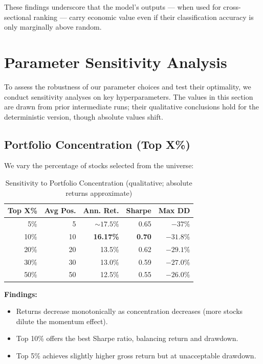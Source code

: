 \documentclass[conference]{IEEEtran}
\begin{document}
These findings underscore that the model's outputs --- when used for cross-sectional ranking --- carry economic value even if their classification accuracy is only marginally above random.

\section{Parameter Sensitivity Analysis}\label{sec:sensitivity}

To assess the robustness of our parameter choices and test their optimality, we conduct sensitivity analyses on key hyperparameters. The values in this section are drawn from prior intermediate runs; their qualitative conclusions hold for the deterministic version, though absolute values shift.


\subsection{Portfolio Concentration (Top X\%)}
We vary the percentage of stocks selected from the universe:

\begin{table}[!t]
\caption{Sensitivity to Portfolio Concentration (qualitative; absolute returns approximate)}
\label{tab:concentration}
\centering
\begin{tabular}{rrrrr}
\toprule
\textbf{Top X\%} & \textbf{Avg Pos.} & \textbf{Ann. Ret.} & \textbf{Sharpe} & \textbf{Max DD} \\
\midrule
5\%  & 5  & $\sim 17.5\%$ & 0.65 & $-37\%$ \\
10\% & 10 & \textbf{16.17\%} & \textbf{0.70} & $-31.8\%$ \\
20\% & 20 & 13.5\%        & 0.62 & $-29.1\%$ \\
30\% & 30 & 13.0\%        & 0.59 & $-27.0\%$ \\
50\% & 50 & 12.5\%        & 0.55 & $-26.0\%$ \\
\bottomrule
\end{tabular}
\end{table}

\textbf{Findings:}
\begin{itemize}
    \item Returns decrease monotonically as concentration decreases (more stocks dilute the momentum effect).
    \item Top 10\% offers the best Sharpe ratio, balancing return and drawdown.
    \item Top 5\% achieves slightly higher gross return but at unacceptable drawdown.
\end{itemize}
\end{document}

